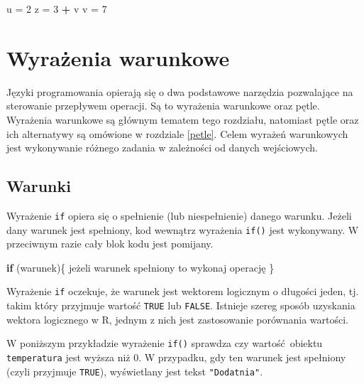 \documentclass[paper=6in:9in,pagesize=pdftex,headinclude=on,footinclude=on,10pt]{scrbook}
\newenvironment{Shaded}{\begin{snugshade}}{\end{snugshade}}
\newcommand{\ControlFlowTok}[1]{\textcolor[rgb]{0.13,0.29,0.53}{\textbf{#1}}}
\newcommand{\DecValTok}[1]{\textcolor[rgb]{0.00,0.00,0.81}{#1}}
\newcommand{\NormalTok}[1]{#1}
\newcommand{\OperatorTok}[1]{\textcolor[rgb]{0.81,0.36,0.00}{\textbf{#1}}}
\newcommand{\StringTok}[1]{\textcolor[rgb]{0.31,0.60,0.02}{#1}}
\begin{document}
\begin{Shaded}
\begin{Highlighting}[]
\NormalTok{u =}\StringTok{ }\DecValTok{2}
\NormalTok{z =}\StringTok{ }\DecValTok{3} \OperatorTok{+}\StringTok{ }\NormalTok{v}
\NormalTok{v =}\StringTok{ }\DecValTok{7}
\end{Highlighting}
\end{Shaded}

\hypertarget{warunki}{%
\chapter{Wyrażenia warunkowe}\label{warunki}}

Języki programowania opierają się o dwa podstawowe narzędzia pozwalające na sterowanie przepływem operacji.
Są to wyrażenia warunkowe oraz pętle.
Wyrażenia warunkowe są głównym tematem tego rozdziału, natomiast pętle oraz ich alternatywy są omówione w rozdziale \ref{petle}.
Celem wyrażeń warunkowych jest wykonywanie różnego zadania w zależności od danych wejściowych.

\hypertarget{warunki-1}{%
\section{Warunki}\label{warunki-1}}

Wyrażenie \texttt{if} opiera się o spełnienie (lub niespełnienie) danego warunku.
Jeżeli dany warunek jest spełniony, kod wewnątrz wyrażenia \texttt{if()} jest wykonywany.
W przeciwnym razie cały blok kodu jest pomijany.

\begin{Shaded}
\begin{Highlighting}[]
\ControlFlowTok{if}\NormalTok{ (warunek)\{}
\NormalTok{  jeżeli warunek spełniony to wykonaj operację}
\NormalTok{\}}
\end{Highlighting}
\end{Shaded}

Wyrażenie \texttt{if} oczekuje, że warunek jest wektorem logicznym o długości jeden, tj. takim który przyjmuje wartość \texttt{TRUE} lub \texttt{FALSE}.
Istnieje szereg sposób uzyskania wektora logicznego w R, jednym z nich jest zastosowanie porównania wartości.

W poniższym przykładzie wyrażenie \texttt{if()} sprawdza czy wartość~obiektu \texttt{temperatura} jest wyższa niż 0.
W przypadku, gdy ten warunek jest spełniony (czyli przyjmuje \texttt{TRUE}), wyświetlany jest tekst \texttt{"Dodatnia"}.
\end{document}
